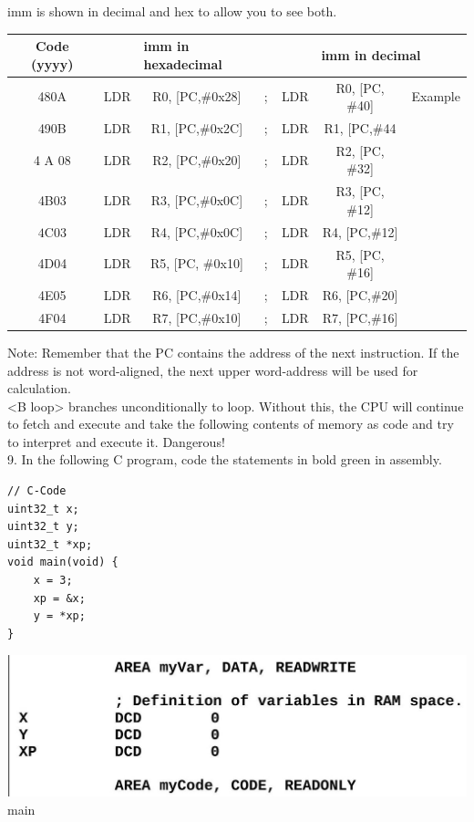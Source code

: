 \documentclass[10pt]{article}
\begin{document}
imm is shown in decimal and hex to allow you to see both.

\begin{center}
\begin{tabular}{|c|c|c|c|c|c|c|}
\hline
Code (yyyy) &  & \multicolumn{2}{|l|}{imm in hexadecimal} & \multicolumn{3}{|c|}{imm in decimal} \\
\hline
480A & LDR & R0, [PC,\#0x28] & ; & LDR & R0, [PC, \#40] & Example \\
\hline
490B & LDR & R1, [PC,\#0x2C] & ; & LDR & R1, [PC,\#44 &  \\
\hline
4 A 08 & LDR & R2, [PC,\#0x20] & ; & LDR & R2, [PC, \#32] &  \\
\hline
4B03 & LDR & R3, [PC,\#0x0C] & ; & LDR & R3, [PC, \#12] &  \\
\hline
$4 \mathrm{C03}$ & LDR & R4, [PC,\#0x0C] & ; & LDR & R4, [PC,\#12] &  \\
\hline
4D04 & LDR & R5, [PC, \#0x10] & ; & LDR & R5, [PC, \#16] &  \\
\hline
4E05 & LDR & R6, [PC,\#0x14] & ; & LDR & R6, [PC,\#20] &  \\
\hline
4F04 & LDR & R7, [PC,\#0x10] & ; & LDR & R7, [PC,\#16] &  \\
\hline
\end{tabular}
\end{center}

Note: Remember that the PC contains the address of the next instruction. If the address is not word-aligned, the next upper word-address will be used for calculation.\\
<B loop> branches unconditionally to loop. Without this, the CPU will continue to fetch and execute and take the following contents of memory as code and try to interpret and execute it. Dangerous!\\
9. In the following C program, code the statements in bold green in assembly.

\begin{verbatim}
// C-Code
uint32_t x;
uint32_t y;
uint32_t *xp;
void main(void) {
    x = 3;
    xp = &x;
    y = *xp;
}
\end{verbatim}

\includegraphics[width=\linewidth]{images/2025_01_02_eeffad754b73de6041b6g-05}\\
main
\end{document}
